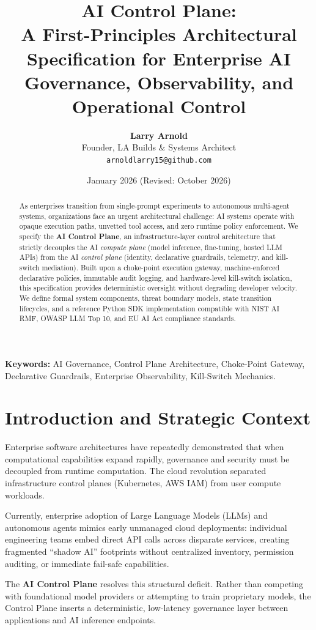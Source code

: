 \documentclass[11pt,a4paper]{article}
\title{\textbf{AI Control Plane:\\A First-Principles Architectural Specification for Enterprise AI Governance, Observability, and Operational Control}}
\author{
    \textbf{Larry Arnold}\\
    Founder, LA Builds \& Systems Architect\\
    \texttt{arnoldlarry15@github.com}
}
\date{January 2026 (Revised: October 2026)}
\begin{document}
\maketitle

\begin{abstract}
As enterprises transition from single-prompt experiments to autonomous multi-agent systems, organizations face an urgent architectural challenge: AI systems operate with opaque execution paths, unvetted tool access, and zero runtime policy enforcement. We specify the \textbf{AI Control Plane}, an infrastructure-layer control architecture that strictly decouples the AI \textit{compute plane} (model inference, fine-tuning, hosted LLM APIs) from the AI \textit{control plane} (identity, declarative guardrails, telemetry, and kill-switch mediation). Built upon a choke-point execution gateway, machine-enforced declarative policies, immutable audit logging, and hardware-level kill-switch isolation, this specification provides deterministic oversight without degrading developer velocity. We define formal system components, threat boundary models, state transition lifecycles, and a reference Python SDK implementation compatible with NIST AI RMF, OWASP LLM Top 10, and EU AI Act compliance standards.
\end{abstract}

\vspace{1em}
\noindent \textbf{Keywords:} AI Governance, Control Plane Architecture, Choke-Point Gateway, Declarative Guardrails, Enterprise Observability, Kill-Switch Mechanics.

\section{Introduction and Strategic Context}
Enterprise software architectures have repeatedly demonstrated that when computational capabilities expand rapidly, governance and security must be decoupled from runtime computation. The cloud revolution separated infrastructure control planes (Kubernetes, AWS IAM) from user compute workloads. 

Currently, enterprise adoption of Large Language Models (LLMs) and autonomous agents mimics early unmanaged cloud deployments: individual engineering teams embed direct API calls across disparate services, creating fragmented ``shadow AI'' footprints without centralized inventory, permission auditing, or immediate fail-safe capabilities.

The \textbf{AI Control Plane} resolves this structural deficit. Rather than competing with foundational model providers or attempting to train proprietary models, the Control Plane inserts a deterministic, low-latency governance layer between applications and AI inference endpoints.
\end{document}

